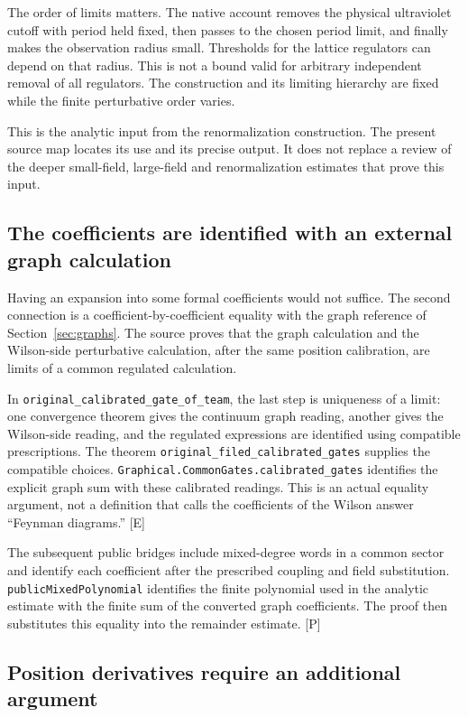 \documentclass[11pt]{article}
\newcommand{\code}[1]{{\small\nolinkurl{#1}}}
\newcommand{\src}[1]{\textsf{[#1]}}
\begin{document}
The order of limits matters. The native account removes the physical
ultraviolet cutoff with period held fixed, then passes to the chosen
period limit, and finally makes the observation radius small. Thresholds
for the lattice regulators can depend on that radius. This is not a
bound valid for arbitrary independent removal of all regulators.
The construction and its limiting hierarchy are fixed while the
finite perturbative order varies.

This is the analytic input from the renormalization construction.
The present source map locates its use and its precise output. It
does not replace a review of the deeper small-field, large-field and
renormalization estimates that prove this input.

\subsection{The coefficients are identified with an external graph calculation}

Having an expansion into some formal coefficients would not suffice.
The second connection is a coefficient-by-coefficient equality with
the graph reference of Section~\ref{sec:graphs}. The source proves that
the graph calculation and the Wilson-side perturbative calculation,
after the same position calibration, are limits of a common regulated
calculation.

In \code{original_calibrated_gate_of_team}, the last step is uniqueness
of a limit: one convergence theorem gives the continuum graph reading,
another gives the Wilson-side reading, and the regulated expressions
are identified using compatible prescriptions. The theorem
\code{original_filed_calibrated_gates} supplies the compatible choices.
\code{Graphical.CommonGates.calibrated_gates} identifies the explicit
graph sum with these calibrated readings. This is an actual equality
argument, not a definition that calls the coefficients of the Wilson
answer ``Feynman diagrams.'' \src{E}

The subsequent public bridges include mixed-degree words in a common
sector and identify each coefficient after the prescribed coupling and
field substitution. \code{publicMixedPolynomial} identifies the finite
polynomial used in the analytic estimate with the finite sum of the
converted graph coefficients. The proof then substitutes this equality
into the remainder estimate. \src{P}

\subsection{Position derivatives require an additional argument}
\end{document}
